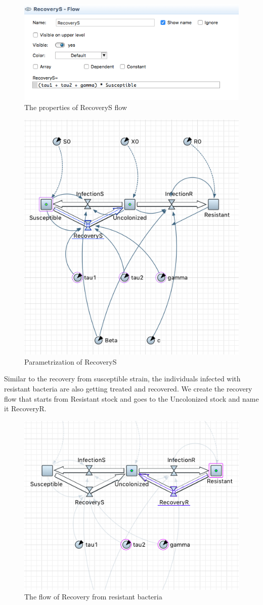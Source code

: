 \begin{figure}[H]
  \centering
  \includegraphics[height=0.3\textwidth]{img/screens/recovery/recovery5}
  \caption{The properties of RecoveryS flow}
\end{figure}

\begin{figure}[H]
  \centering
  \includegraphics[height=0.6\textwidth]{img/screens/recovery/recovery7}
  \caption{Parametrization of RecoveryS}
\end{figure}

Similar to the recovery from susceptible strain, the individuals infected with resistant bacteria are also getting treated and recovered. We create the recovery flow that starts from Resistant stock and goes to the Uncolonized stock and name it RecoveryR.

\begin{figure}[H]
  \centering
  \includegraphics[height=0.5\textwidth]{img/screens/recovery/recovery8}
  \caption{The flow of Recovery from resistant bacteria}
\end{figure}


